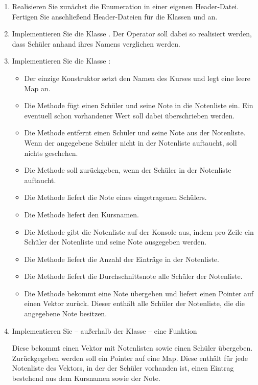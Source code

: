 \begin{enumerate}
	\item Realisieren Sie zunächst die Enumeration  in einer eigenen Header-Datei.
	Fertigen Sie anschließend Header-Dateien für die Klassen  und  an.
	\item Implementieren Sie die Klasse .
	Der Operator \code{<} soll dabei so realisiert werden, dass Schüler anhand ihres Namens verglichen werden.
	\item Implementieren Sie die Klasse :
	\begin{itemize}
		\item Der einzige Konstruktor setzt den Namen des Kurses und legt eine leere Map an.
		\item Die Methode  fügt einen Schüler und seine Note in die Notenliste ein.
		Ein eventuell schon vorhandener Wert soll dabei überschrieben werden.
		\item Die Methode  entfernt einen Schüler und seine Note aus der Notenliste.
		Wenn der angegebene Schüler nicht in der Notenliste auftaucht, soll nichts geschehen.
		\item Die Methode  soll  zurückgeben, wenn der Schüler in der Notenliste auftaucht.
		\item Die Methode  liefert die Note eines eingetragenen Schülers.
		\item Die Methode  liefert den Kursnamen.
		\item Die Methode  gibt die Notenliste auf der Konsole aus, indem pro Zeile ein Schüler der Notenliste und seine Note ausgegeben werden.
		\item Die Methode  liefert die Anzahl der Einträge in der Notenliste.
		\item Die Methode  liefert die Durchschnittsnote alle Schüler der Notenliste.
		\item Die Methode  bekommt eine Note übergeben und liefert einen Pointer auf einen Vektor zurück.
		Dieser enthält alle Schüler der Notenliste, die die angegebene Note besitzen.
	\end{itemize} \newpage
	\item Implementieren Sie -- außerhalb der Klasse  -- eine Funktion
	\begin{center}
	\end{center}
	Diese bekommt einen Vektor mit Notenlisten sowie einen Schüler übergeben.
	Zurückgegeben werden soll ein Pointer auf eine Map.
	Diese enthält für jede Notenliste des Vektors, in der der Schüler vorhanden ist, einen Eintrag bestehend aus dem Kursnamen sowie der Note.
\end{enumerate}
